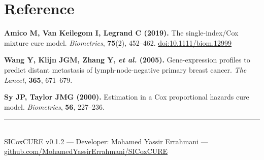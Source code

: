 \documentclass[12pt,a4paper]{article}
\begin{document}
\section{Reference}

\textbf{Amico M, Van Keilegom I, Legrand C (2019).}
The single-index/Cox mixture cure model.
\textit{Biometrics}, \textbf{75}(2), 452--462.
\href{https://doi.org/10.1111/biom.12999}{doi:10.1111/biom.12999}

\bigskip

\textbf{Wang Y, Klijn JGM, Zhang Y, \textit{et al.} (2005).}
Gene-expression profiles to predict distant metastasis of
lymph-node-negative primary breast cancer.
\textit{The Lancet}, \textbf{365}, 671--679.

\bigskip

\textbf{Sy JP, Taylor JMG (2000).}
Estimation in a Cox proportional hazards cure model.
\textit{Biometrics}, \textbf{56}, 227--236.

\vfill

\begin{center}
  \textcolor{gris2}{\rule{0.8\linewidth}{0.5pt}}\\[0.3cm]
  {\small\color{gris2}
    SICoxCURE v0.1.2 ---
    Developer: Mohamed Yassir Errahmani ---
    \href{https://github.com/MohamedYassirErrahmani/SICoxCURE}
    {github.com/MohamedYassirErrahmani/SICoxCURE}
  }
\end{center}
\end{document}
